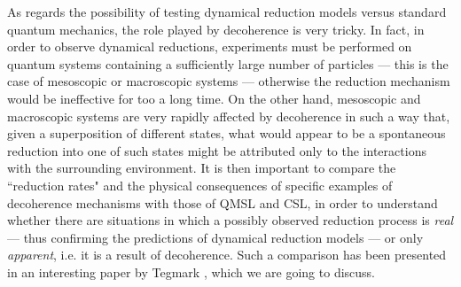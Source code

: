 \documentclass[10pt,a4paper]{article}
\begin{document}
As regards the possibility of testing dynamical reduction models
versus standard quantum mechanics, the role played by decoherence
is very tricky. In fact, in order to observe dynamical reductions,
experiments must be performed on quantum systems containing a
sufficiently large number of particles --- this is the case of
mesoscopic or macroscopic systems --- otherwise the reduction
mechanism would be ineffective for too a long time. On the other
hand, mesoscopic and macroscopic systems are very rapidly affected
by decoherence in such a way that, given a superposition of
different states, what would appear to be a spontaneous reduction
into one of such states might be attributed only to the
interactions with the surrounding environment. It is then
important to compare the ``reduction rates" and the physical
consequences of specific examples of decoherence mechanisms  with
those of QMSL and CSL, in order to understand whether there are
situations in which a possibly observed reduction process is
{\it real} --- thus confirming the predictions of dynamical
reduction models --- or only {\it apparent}, i.e. it is a result of
decoherence. Such a comparison has been presented in an
interesting  paper by Tegmark \cite{teg}, which we are going to
discuss.
\end{document}
